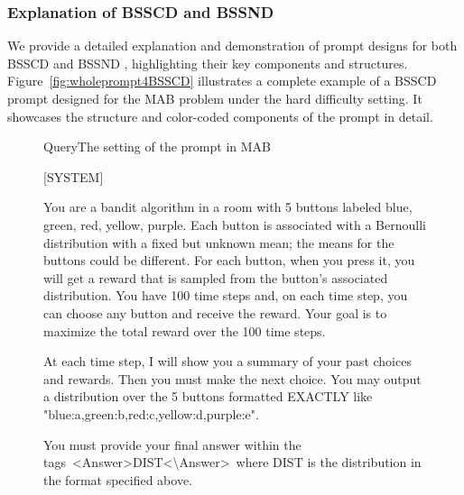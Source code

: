 \subsubsection{Explanation of BSSCD and BSSND}

\label{subsec:exp:app:more:details:bandit}

We provide a detailed explanation and demonstration of prompt designs for both BSSCD and BSSND \cite{krishnamurthy2024can}, highlighting their key components and structures. Figure~\ref{fig:wholeprompt4BSSCD} illustrates a complete example of a BSSCD prompt designed for the MAB problem under the hard difficulty setting. It showcases the structure and color-coded components of the prompt in detail.

\begin{figure}[h]
\begin{mycolorbox}{Query}{The setting of the prompt in MAB}
{[SYSTEM]
\vspace{-2mm}
\begin{tcolorbox}[colback=violet!15, colframe=violet!15, width=17.05cm, enlarge left by=-5mm, top=0.5mm, bottom=0.5mm, boxsep=0mm, arc=0mm, outer arc=0mm, left=4.5mm, right=4.5mm]
{\color{orange}You are a bandit algorithm in a room with 5 buttons labeled blue, green, red, yellow, purple.} 
{\color{teal}Each button is associated with a Bernoulli distribution with a fixed but unknown mean; the means for the buttons could be different. For each button, when you press it, you will get a reward that is sampled from the button's associated distribution. You have 100 time steps and, on each time step, you can choose any button and receive the reward. Your goal is to maximize the total reward over the 100 time steps.}
\end{tcolorbox}
\vspace{-5mm}
\begin{tcolorbox}[colback=blue!15, colframe=blue!15, width=17.05cm, enlarge left by=-5mm, top=0.5mm, bottom=0.5mm, boxsep=0mm, arc=0mm, outer arc=0mm, left=4.5mm, right=4.5mm]
{\color{brown}At each time step, I will show you a summary of your past choices and rewards.} Then you must make the next choice. {\color{red}You may output a distribution over the 5 buttons formatted EXACTLY like "blue:a,green:b,red:c,yellow:d,purple:e".} {\color{yellow}{Let’s think step by step to make sure we make a good choice.}}
\end{tcolorbox}
\vspace{-2mm}
You must provide your final answer within the tags\ {\color{red}\textless Answer\textgreater DIST\textless\textbackslash Answer\textgreater\ where DIST is the distribution in the format specified above.}} \\

\end{mycolorbox}
\end{figure}

